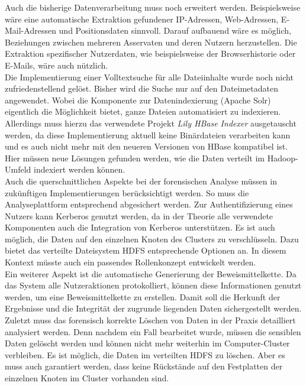 \noindent
Auch die bisherige Datenverarbeitung muss noch erweitert werden. Beispielsweise wäre eine automatische Extraktion gefundener IP-Adressen, Web-Adressen, E-Mail-Adressen und Positionsdaten sinnvoll. Darauf aufbauend wäre es möglich, Beziehungen zwischen mehreren Asservaten und deren Nutzern herzustellen. Die Extraktion spezifischer Nutzerdaten, wie beispielsweise der Browserhistorie oder E-Mails, wäre auch nützlich.\\

\noindent
Die Implementierung einer Volltextsuche für alle Dateiinhalte wurde noch nicht zufriedenstellend gelöst. Bisher wird die Suche nur auf den Dateimetadaten angewendet. Wobei die Komponente zur Datenindexierung (Apache Solr) eigentlich die Möglichkeit bietet, ganze Dateien automatisiert zu indexieren. Allerdings muss hierzu das verwendete Projekt \textit{Lily HBase Indexer} ausgetauscht werden, da diese Implementierung aktuell keine Binärdateien verarbeiten kann und es auch nicht mehr mit den neueren Versionen von HBase kompatibel ist. Hier müssen neue Lösungen gefunden werden, wie die Daten verteilt im Hadoop-Umfeld indexiert werden können.\\

\noindent
Auch die querschnittlichen Aspekte bei der forensischen Analyse müssen in zukünftigen Implementierungen berücksichtigt werden. So muss die Analyseplattform entsprechend abgesichert werden. Zur Authentifizierung eines Nutzers kann Kerberos genutzt werden, da in der Theorie alle verwendete Komponenten auch die Integration von Kerberos unterstützen. Es ist auch möglich, die Daten auf den einzelnen Knoten des Clusters zu verschlüsseln. Dazu bietet das verteilte Dateisystem HDFS entsprechende Optionen an. In diesem Kontext müsste auch ein passendes Rollenkonzept entwickelt werden.\\
Ein weiterer Aspekt ist die automatische Generierung der Beweismittelkette. Da das System alle Nutzeraktionen protokolliert, können diese Informationen genutzt werden, um eine Beweismittelkette zu erstellen. Damit soll die Herkunft der Ergebnisse und die Integrität der zugrunde liegenden Daten sichergestellt werden.\\
Zuletzt muss das forensisch korrekte Löschen von Daten in der Praxis detailliert analysiert werden. Denn nachdem ein Fall bearbeitet wurde, müssen die sensiblen Daten gelöscht werden und können nicht mehr weiterhin im Computer-Cluster verbleiben. Es ist  möglich, die Daten im verteilten HDFS zu löschen. Aber es muss auch garantiert werden, dass keine Rückstände auf den Festplatten der einzelnen Knoten im Cluster vorhanden sind.